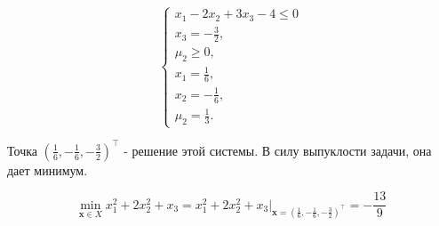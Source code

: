 \documentclass[12pt]{article}
\begin{document}
\begin{equation}
\begin{cases}
x_1 - 2x_2+3x_3 -4\leq 0\\
x_3= -\frac{3}{2},\\
\mu_2\geq 0,\\
x_1=\frac{1}{6},\\
x_2=-\frac{1}{6},\\
\mu_2 = \frac{1}{3}.
\end{cases}
\end{equation}

Точка $(\frac{1}{6}, -\frac{1}{6}, -\frac{3}{2})^\top$ - решение этой системы. В силу выпуклости задачи, она дает минимум.

$$\boxed{\min\limits_{\textbf{x}\in X }x_1^2+2x_2^2 +x_3 = x_1^2+2x_2^2 +x_3\Big|_{\textbf{x}=(\frac{1}{6}, -\frac{1}{6}, -\frac{3}{2})^\top} = -\frac{13}{9}}$$
\end{document}
